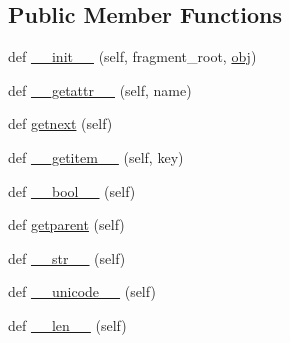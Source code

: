 \subsection*{Public Member Functions}
\begin{DoxyCompactItemize}
\item 
def \hyperlink{classpip_1_1__vendor_1_1html5lib_1_1treewalkers_1_1etree__lxml_1_1FragmentWrapper_ad4d168d009d4f86ec6c2786e127c1885}{\+\_\+\+\_\+init\+\_\+\+\_\+} (self, fragment\+\_\+root, \hyperlink{classpip_1_1__vendor_1_1html5lib_1_1treewalkers_1_1etree__lxml_1_1FragmentWrapper_a0f74154790d95e13a7c0f260778d8c7e}{obj})
\item 
def \hyperlink{classpip_1_1__vendor_1_1html5lib_1_1treewalkers_1_1etree__lxml_1_1FragmentWrapper_a8bde9c6c45fc9258008d1e70f9806491}{\+\_\+\+\_\+getattr\+\_\+\+\_\+} (self, name)
\item 
def \hyperlink{classpip_1_1__vendor_1_1html5lib_1_1treewalkers_1_1etree__lxml_1_1FragmentWrapper_a8911b5a91edfea770b38acdea0afec60}{getnext} (self)
\item 
def \hyperlink{classpip_1_1__vendor_1_1html5lib_1_1treewalkers_1_1etree__lxml_1_1FragmentWrapper_a7085331953c413a89cee08c6b674a8c1}{\+\_\+\+\_\+getitem\+\_\+\+\_\+} (self, key)
\item 
def \hyperlink{classpip_1_1__vendor_1_1html5lib_1_1treewalkers_1_1etree__lxml_1_1FragmentWrapper_afd239e71522dad20ab890c153f97e5ee}{\+\_\+\+\_\+bool\+\_\+\+\_\+} (self)
\item 
def \hyperlink{classpip_1_1__vendor_1_1html5lib_1_1treewalkers_1_1etree__lxml_1_1FragmentWrapper_a2b9774ae9b6b83b987848c50ecdd2cfc}{getparent} (self)
\item 
def \hyperlink{classpip_1_1__vendor_1_1html5lib_1_1treewalkers_1_1etree__lxml_1_1FragmentWrapper_a754ccdac38a8815128c08777cb2d5b84}{\+\_\+\+\_\+str\+\_\+\+\_\+} (self)
\item 
def \hyperlink{classpip_1_1__vendor_1_1html5lib_1_1treewalkers_1_1etree__lxml_1_1FragmentWrapper_abe8ae8721ef8221e7b1aa7fb069f36cd}{\+\_\+\+\_\+unicode\+\_\+\+\_\+} (self)
\item 
def \hyperlink{classpip_1_1__vendor_1_1html5lib_1_1treewalkers_1_1etree__lxml_1_1FragmentWrapper_a91c62ceeec5505ea5c2dd6cf72510990}{\+\_\+\+\_\+len\+\_\+\+\_\+} (self)
\end{DoxyCompactItemize}
